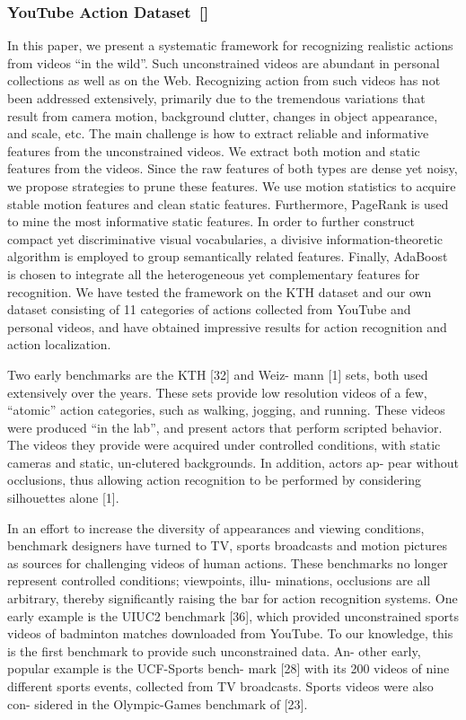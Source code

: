 \subsubsection{YouTube Action Dataset~[\cite{liu_recognizing_2009}]}
In this paper, we present a systematic framework for recognizing realistic actions from videos “in the wild”. Such unconstrained videos are abundant in personal collections as well as on the Web. Recognizing action from such videos has not been addressed extensively, primarily due to the tremendous variations that result from camera motion, background clutter, changes in object appearance, and scale, etc. The main challenge is how to extract reliable and informative features from the unconstrained videos. We extract both motion and static features from the videos. Since the raw features of both types are dense yet noisy, we propose strategies to prune these features. We use motion statistics to acquire stable motion features and clean static features. Furthermore, PageRank is used to mine the most informative static features. In order to further construct compact yet discriminative visual vocabularies, a divisive information-theoretic algorithm is employed to group semantically related features. Finally, AdaBoost is chosen to integrate all the heterogeneous yet complementary features for recognition. We have tested the framework on the KTH dataset and our own dataset consisting of 11 categories of actions collected from YouTube and personal videos, and have obtained impressive results for action recognition and action localization.

Two early benchmarks are the KTH [32] and Weiz-
mann [1] sets, both used extensively over the years. These
sets provide low resolution videos of a few, “atomic” action
categories, such as walking, jogging, and running. These
videos were produced “in the lab”, and present actors that
perform scripted behavior. The videos they provide were
acquired under controlled conditions, with static cameras
and static, un-clutered backgrounds. In addition, actors ap-
pear without occlusions, thus allowing action recognition to
be performed by considering silhouettes alone [1].

In an effort to increase the diversity of appearances and
viewing conditions, benchmark designers have turned to
TV, sports broadcasts and motion pictures as sources for
challenging videos of human actions. These benchmarks
no longer represent controlled conditions; viewpoints, illu-
minations, occlusions are all arbitrary, thereby significantly
raising the bar for action recognition systems.
One early example is the UIUC2 benchmark [36], which
provided unconstrained sports videos of badminton matches
downloaded from YouTube. To our knowledge, this is the
first benchmark to provide such unconstrained data. An-
other early, popular example is the UCF-Sports bench-
mark [28] with its 200 videos of nine different sports events,
collected from TV broadcasts. Sports videos were also con-
sidered in the Olympic-Games benchmark of [23].


